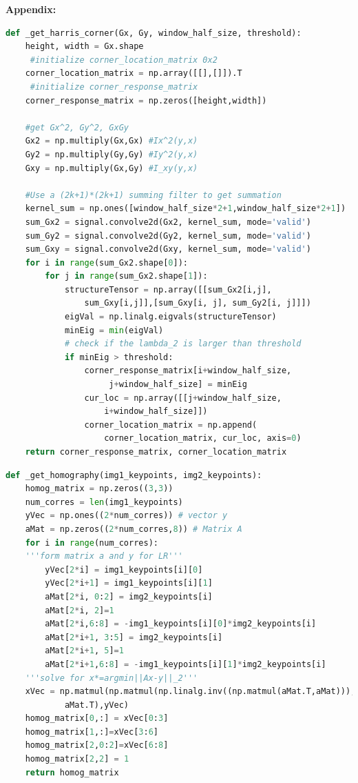 \documentclass[12pt]{article}
\begin{document}
	
	
	
	
	
	
	
	\pagebreak
	\textbf{Appendix:}
\begin{lstlisting}[language=python]
def _get_harris_corner(Gx, Gy, window_half_size, threshold):
	height, width = Gx.shape
	 #initialize corner_location_matrix 0x2
	corner_location_matrix = np.array([[],[]]).T
	 #initialize corner_response_matrix 
	corner_response_matrix = np.zeros([height,width])
	
	#get Gx^2, Gy^2, GxGy
	Gx2 = np.multiply(Gx,Gx) #Ix^2(y,x)
	Gy2 = np.multiply(Gy,Gy) #Iy^2(y,x)
	Gxy = np.multiply(Gx,Gy) #I_xy(y,x)
	
	#Use a (2k+1)*(2k+1) summing filter to get summation
	kernel_sum = np.ones([window_half_size*2+1,window_half_size*2+1])
	sum_Gx2 = signal.convolve2d(Gx2, kernel_sum, mode='valid')
	sum_Gy2 = signal.convolve2d(Gy2, kernel_sum, mode='valid')
	sum_Gxy = signal.convolve2d(Gxy, kernel_sum, mode='valid')
	for i in range(sum_Gx2.shape[0]):
		for j in range(sum_Gx2.shape[1]):
			structureTensor = np.array([[sum_Gx2[i,j], 
				sum_Gxy[i,j]],[sum_Gxy[i, j], sum_Gy2[i, j]]])
			eigVal = np.linalg.eigvals(structureTensor)
			minEig = min(eigVal)
			# check if the lambda_2 is larger than threshold
			if minEig > threshold:
				corner_response_matrix[i+window_half_size,
					 j+window_half_size] = minEig
				cur_loc = np.array([[j+window_half_size,
					i+window_half_size]])
				corner_location_matrix = np.append(
					corner_location_matrix, cur_loc, axis=0)
	return corner_response_matrix, corner_location_matrix
\end{lstlisting}
\pagebreak
\begin{lstlisting}[language=python]
def _get_homography(img1_keypoints, img2_keypoints):
	homog_matrix = np.zeros((3,3))
	num_corres = len(img1_keypoints)
	yVec = np.ones((2*num_corres)) # vector y
	aMat = np.zeros((2*num_corres,8)) # Matrix A
	for i in range(num_corres): 
	'''form matrix a and y for LR'''
		yVec[2*i] = img1_keypoints[i][0]
		yVec[2*i+1] = img1_keypoints[i][1]
		aMat[2*i, 0:2] = img2_keypoints[i]
		aMat[2*i, 2]=1
		aMat[2*i,6:8] = -img1_keypoints[i][0]*img2_keypoints[i]
		aMat[2*i+1, 3:5] = img2_keypoints[i]
		aMat[2*i+1, 5]=1
		aMat[2*i+1,6:8] = -img1_keypoints[i][1]*img2_keypoints[i]
	'''solve for x*=argmin||Ax-y||_2'''
	xVec = np.matmul(np.matmul(np.linalg.inv((np.matmul(aMat.T,aMat))),
			aMat.T),yVec)
	homog_matrix[0,:] = xVec[0:3]
	homog_matrix[1,:]=xVec[3:6]
	homog_matrix[2,0:2]=xVec[6:8]
	homog_matrix[2,2] = 1
	return homog_matrix

\end{lstlisting}
\end{document}
